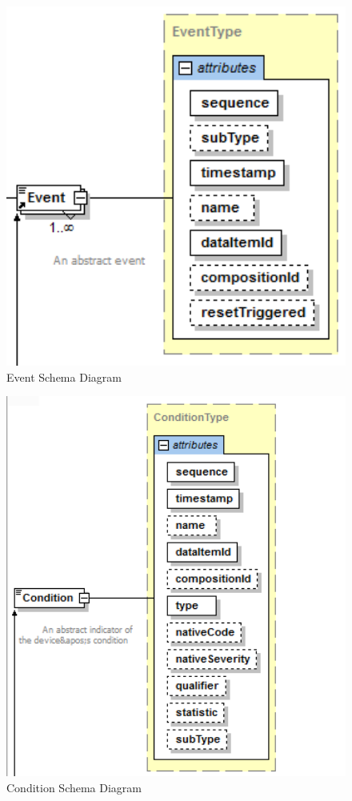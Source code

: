\begin{figure}[ht]
  \centering
    \includegraphics[width=1.0\textwidth]{figures/Event Schema.png}
  \caption{Event Schema Diagram}
  \label{fig:Event Schema Diagram}
\end{figure}

\FloatBarrier


\begin{figure}[ht]
  \centering
    \includegraphics[width=1.0\textwidth]{figures/Condition Schema.png}
  \caption{Condition Schema Diagram}
  \label{fig:Condition Schema Diagram}
\end{figure}

